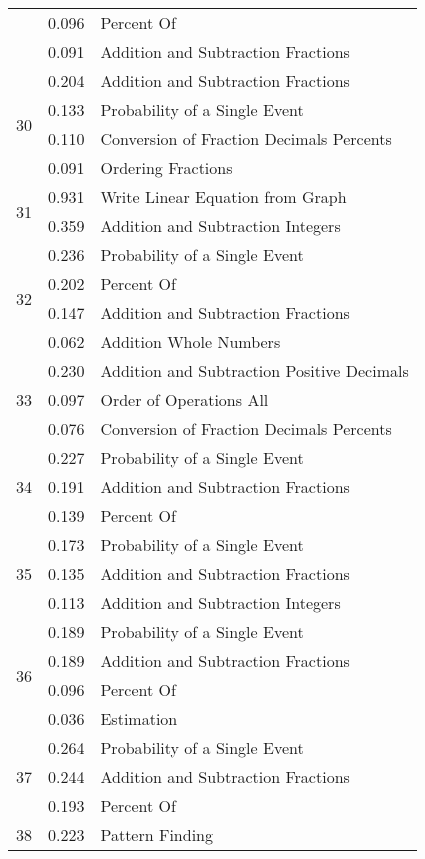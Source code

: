 \begin{longtable}[c]{|c|c|l|}
 & 0.096 & Percent Of \\
 & 0.091 & Addition and Subtraction Fractions \\
\hline
\multirow{4}{*}{30} & 0.204 & Addition and Subtraction Fractions \\
 & 0.133 & Probability of a Single Event \\
 & 0.110 & Conversion of Fraction Decimals Percents \\
 & 0.091 & Ordering Fractions \\
\hline
\multirow{2}{*}{31} & 0.931 & Write Linear Equation from Graph \\
 & 0.359 & Addition and Subtraction Integers \\
\hline
\multirow{4}{*}{32} & 0.236 & Probability of a Single Event \\
 & 0.202 & Percent Of \\
 & 0.147 & Addition and Subtraction Fractions \\
 & 0.062 & Addition Whole Numbers \\
\hline
\multirow{3}{*}{33} & 0.230 & Addition and Subtraction Positive Decimals \\
 & 0.097 & Order of Operations All \\
 & 0.076 & Conversion of Fraction Decimals Percents \\
\hline
\multirow{3}{*}{34} & 0.227 & Probability of a Single Event \\
 & 0.191 & Addition and Subtraction Fractions \\
 & 0.139 & Percent Of \\
\hline
\multirow{3}{*}{35} & 0.173 & Probability of a Single Event \\
 & 0.135 & Addition and Subtraction Fractions \\
 & 0.113 & Addition and Subtraction Integers \\
\hline
\multirow{4}{*}{36} & 0.189 & Probability of a Single Event \\
 & 0.189 & Addition and Subtraction Fractions \\
 & 0.096 & Percent Of \\
 & 0.036 & Estimation \\
\hline
\multirow{3}{*}{37} & 0.264 & Probability of a Single Event \\
 & 0.244 & Addition and Subtraction Fractions \\
 & 0.193 & Percent Of \\
\hline
\multirow{4}{*}{38} & 0.223 & Pattern Finding  \\

\end{longtable}
